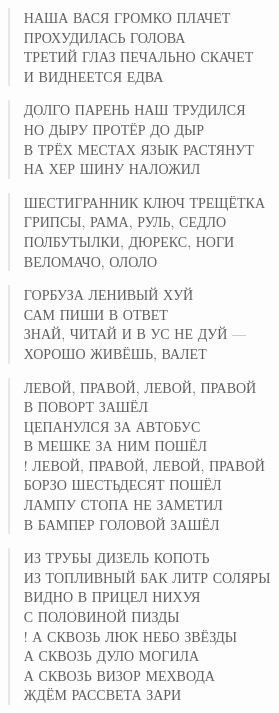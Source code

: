\poemtitle{***}
\begin{verse}
НАША ВАСЯ ГРОМКО ПЛАЧЕТ\\
ПРОХУДИЛАСЬ ГОЛОВА\\
ТРЕТИЙ ГЛАЗ ПЕЧАЛЬНО СКАЧЕТ\\
И ВИДНЕЕТСЯ ЕДВА
\end{verse}

\poemtitle{***}
\begin{verse}
ДОЛГО ПАРЕНЬ НАШ ТРУДИЛСЯ\\
НО ДЫРУ ПРОТЁР ДО ДЫР\\
В ТРЁХ МЕСТАХ ЯЗЫК РАСТЯНУТ\\
НА ХЕР ШИНУ НАЛОЖИЛ
\end{verse}

\poemtitle{***}
\begin{verse}
ШЕСТИГРАННИК КЛЮЧ ТРЕЩЁТКА\\
ГРИПСЫ, РАМА, РУЛЬ, СЕДЛО\\
ПОЛБУТЫЛКИ, ДЮРЕКС, НОГИ\\
ВЕЛОМАЧО, ОЛОЛО
\end{verse}

\poemtitle{***}
\begin{verse}
ГОРБУЗА ЛЕНИВЫЙ ХУЙ\\
САМ ПИШИ В ОТВЕТ\\
ЗНАЙ, ЧИТАЙ И В УС НЕ ДУЙ —\\
ХОРОШО ЖИВЁШЬ, ВАЛЕТ
\end{verse}

\poemtitle{***}
\begin{verse}
ЛЕВОЙ, ПРАВОЙ, ЛЕВОЙ, ПРАВОЙ\\
В ПОВОРТ ЗАШЁЛ \\
ЦЕПАНУЛСЯ ЗА АВТОБУС\\
В МЕШКЕ ЗА НИМ ПОШЁЛ\\!
ЛЕВОЙ, ПРАВОЙ, ЛЕВОЙ, ПРАВОЙ\\
БОРЗО ШЕСТЬДЕСЯТ ПОШЁЛ\\
ЛАМПУ СТОПА НЕ ЗАМЕТИЛ\\
В БАМПЕР ГОЛОВОЙ ЗАШЁЛ
\end{verse}

\poemtitle{***}
\begin{verse}
ИЗ ТРУБЫ ДИЗЕЛЬ КОПОТЬ\\
ИЗ ТОПЛИВНЫЙ БАК ЛИТР СОЛЯРЫ\\
ВИДНО В ПРИЦЕЛ НИХУЯ \\
С ПОЛОВИНОЙ ПИЗДЫ\\!
А СКВОЗЬ ЛЮК НЕБО ЗВЁЗДЫ\\
А СКВОЗЬ ДУЛО  МОГИЛА\\
А СКВОЗЬ ВИЗОР МЕХВОДА\\
ЖДЁМ РАССВЕТА ЗАРИ
\end{verse}

